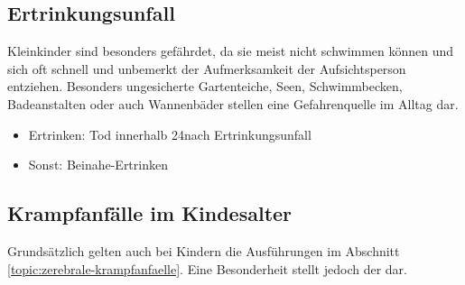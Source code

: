 \subsection{Ertrinkungsunfall}

{\TxBeschreibung}
{%
Kleinkinder sind besonders gefährdet, da sie meist nicht
schwimmen können und sich oft schnell und unbemerkt der
Aufmerksamkeit der Aufsichtsperson entziehen. Besonders
ungesicherte Gartenteiche, Seen, Schwimmbecken, Badeanstalten
oder auch Wannenbäder stellen eine Gefahrenquelle im Alltag
dar.}
{
\begin{itemize}
  \item Ertrinken: Tod innerhalb 24\Hours* nach Ertrinkungsunfall
  \item Sonst: Beinahe-Ertrinken
\end{itemize}
}
{}
{}
{}







\subsection{Krampfanfälle im Kindesalter}
\label{topic:krampfanfaelle-kinder}

Grundsätzlich gelten auch bei Kindern die Ausführungen im
Abschnitt \ref{topic:zerebrale-krampfanfaelle}. Eine
Besonderheit stellt jedoch der  dar.


